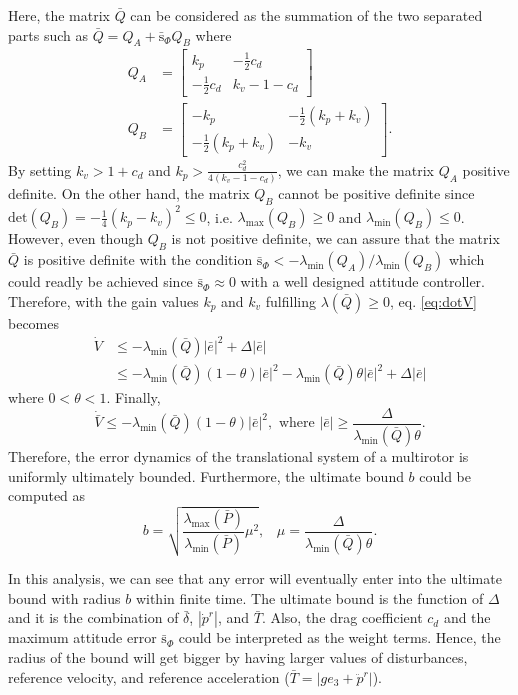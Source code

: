 \documentclass[letterpaper, 10 pt, conference]{ieeeconf}  %
\begin{document}
Here, the matrix $\bar{Q}$ can be considered as the summation of the two separated parts such as $\bar{Q} = Q_A + \bar{\text{s}}_\Phi Q_B$ where
\begin{align}
Q_A &= \left[
\begin{array}{rr}
k_p & -\frac{1}{2}c_d \\ -\frac{1}{2}c_d & k_v-1-c_d
\end{array}
\right] \nonumber \\
Q_B &= \left[
\begin{array}{rr}
-k_p & -\frac{1}{2}(k_p+k_v) \\ -\frac{1}{2}(k_p+k_v) & -k_v
\end{array}
\right].
\end{align}
By setting $k_v > 1+c_d$ and $k_p > \frac{c_d^2}{4(k_v-1-c_d)}$, we can make the matrix $Q_A$ positive definite. 
On the other hand, the matrix $Q_B$ cannot be positive definite since $\text{det}(Q_B) = -\frac{1}{4}(k_p-k_v)^2 \leq 0$, i.e. $\lambda_{\max}(Q_B)\geq0$ and $\lambda_{\min}(Q_B)\leq 0$.
However, even though $Q_B$ is not positive definite, we can assure that the matrix $\bar{Q}$ is positive definite with the condition $\bar{\text{s}}_\Phi < -\lambda_{\min}(Q_A)/\lambda_{\min}(Q_B)$
which could readly be achieved since $\bar{\text{s}}_\Phi \approx 0$ with a well designed attitude controller.
Therefore, with the gain values $k_p$ and $k_v$ fulfilling $\lambda(\bar{Q}) \geq 0$, eq. \eqref{eq:dotV} becomes
\begin{align}
\dot{V} &\leq -\lambda_{\min}(\bar{Q})|\bar{e}|^2 + \Delta|\bar{e}| \nonumber \\
&\leq -\lambda_{\min}(\bar{Q})(1-\theta)|\bar{e}|^2-\lambda_{\min}(\bar{Q})\theta|\bar{e}|^2 + \Delta|\bar{e}| \nonumber
\end{align}
where $0<\theta<1$.
Finally,
\begin{equation}
\dot{\bar{V}} \leq -\lambda_{\min}(\bar{Q})(1-\theta)|\bar{e}|^2, \text{ where } |\bar{e}| \geq \frac{\Delta}{\lambda_{\min}(\bar{Q})\theta}. \nonumber
\end{equation}
Therefore, the error dynamics of the translational system of a multirotor is uniformly ultimately bounded. Furthermore, the ultimate bound $b$ could be computed as 
\begin{equation}
b = \sqrt{\frac{\lambda_{\max}(\bar{P})}{\lambda_{\min}(\bar{P})}\mu^2},\;\;\;
\mu = \frac{\Delta}{\lambda_{\min}(\bar{Q})\theta}. 
\label{eq:expected}
\end{equation}

In this analysis, we can see that any error will eventually enter into the ultimate bound with radius $b$ within finite time. 
The ultimate bound is the function of $\Delta$ and it is the combination of $\bar{\delta}$, $|\dot{p}^r|$, and $\bar{T}$. Also, the drag coefficient $c_d$ and the maximum attitude error $\bar{\text{s}}_\Phi$ could be interpreted as the weight terms. 
Hence, the radius of the bound will get bigger by having larger values of disturbances, reference velocity, and reference acceleration ($\bar{T} = |ge_3 + \ddot{p}^r|$). 
\end{document}

